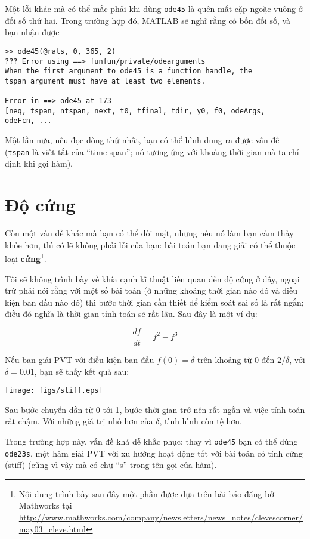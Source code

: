 \documentclass[12pt]{book}
\begin{document}
Một lỗi khác mà có thể mắc phải khi dùng {\tt ode45} là 
quên mất cặp ngoặc vuông ở đối số thứ hai. Trong trường hợp đó,
MATLAB sẽ nghĩ rằng có bốn đối số, và bạn nhận được

\begin{verbatim}
>> ode45(@rats, 0, 365, 2)
??? Error using ==> funfun/private/odearguments
When the first argument to ode45 is a function handle, the 
tspan argument must have at least two elements.

Error in ==> ode45 at 173
[neq, tspan, ntspan, next, t0, tfinal, tdir, y0, f0, odeArgs, 
odeFcn, ...
\end{verbatim}
%
Một lần nữa, nếu đọc dòng thứ nhất, bạn có thể hình dung ra
được vấn đề ({\tt tspan} là viết tắt của ``time span''; nó tương ứng
với khoảng thời gian mà ta chỉ định khi gọi hàm).


\section{Độ cứng}

Còn một vấn đề khác mà bạn có thể đối mặt, nhưng nếu nó làm bạn
cảm thấy khỏe hơn, thì có lẽ không phải lỗi của bạn: bài toán bạn
đang giải có thể thuộc loại {\bf cứng}\footnote{Nội dung trình bày
sau đây một phần được dựa trên bài báo đăng bởi Mathworks tại
\url{http://www.mathworks.com/company/newsletters/news_notes/clevescorner/may03_cleve.html}}.

Tôi sẽ không trình bày về khía cạnh kĩ thuật liên quan đến độ cứng 
ở đây, ngoại trừ phải nói rằng với một số bài toán (ở những khoảng
thời gian nào đó và điều kiện ban đầu nào đó) thì bước thời gian cần thiết
để kiểm soát sai số là rất ngắn; điều đó nghĩa là thời gian tính toán
sẽ rất lâu. Sau đây là một ví dụ:

\[ \frac{df}{dt} = f^2 - f^3 \]

Nếu bạn giải PVT với điều kiện ban đầu  $f(0) = \delta$ trên khoảng
từ 0 đến $2/\delta$, với $\delta = 0.01$, bạn sẽ thấy kết quả sau:

\centerline{\texttt{[image: figs/stiff.eps]}}

Sau bước chuyển dần từ 0 tới 1, bước thời gian trở nên rất ngắn
và việc tính toán rất chậm. Với những giá trị nhỏ hơn của $\delta$, 
tình hình còn tệ hơn.

Trong trường hợp này, vấn đề khá dễ khắc phục: thay vì {\tt ode45}
bạn có thể dùng {\tt ode23s}, một hàm giải PVT với xu hướng 
hoạt động tốt với bài toán có tính cứng (stiff) (cũng vì vậy mà có
chữ ``s'' trong tên gọi của hàm).
\end{document}
